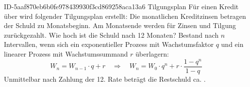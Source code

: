 \begin{exercise}
      {ID-5aaf870eb6b0fe978439930f3cd869258aca13a6}
      {Tilgungsplan}
  \ifproblem\problem
    Für einen Kredit über  wird folgender Tilgungsplan
    erstellt: Die monatlichen Kreditzinsen betragen 
    der Schuld zu Monatsbeginn. Am Monatsende werden 
    für Zinsen und Tilgung zurückgezahlt. Wie hoch ist die
    Schuld nach \num{12} Monaten?
  \fi
  \ifoutline\outline
    Bestand nach $n$ Intervallen, wenn sich ein exponentieller Prozess mit
    Wachstumsfaktor $q$ und ein linearer Prozess mit Wachstumssummand $r$
    überlagern:
    \begin{equation*}
      W_{n}=W_{n-1}\cdot q+r
      \quad\Rightarrow\quad
      W_{n}=W_{0}\cdot q^{n}+r\cdot\frac{1-q^n}{1-q}
    \end{equation*}
  \fi
  \ifoutcome\outcome
    Unmittelbar nach Zahlung der 12. Rate beträgt die
    Restschuld ca. .
  \fi
\end{exercise}

